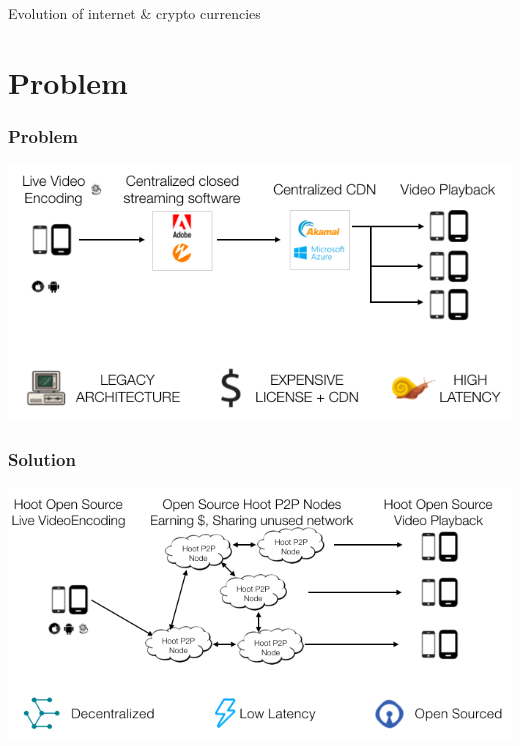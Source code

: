 \documentclass[10pt,handout]{beamer}
\begin{document}
\begin{frame}[t]{Evolution of internet \& crypto currencies}
 
\end{frame} 
\section{Problem}
\begin{frame}[t]\frametitle{Problem}

   \includegraphics[width=1.0\textwidth]{static/problem-architecture-trans}

\end{frame}
\begin{frame}[t]\frametitle{Solution}
   \includegraphics[width=1.0\textwidth]{static/hoot-solution-trans}

\end{frame}
\end{document}

